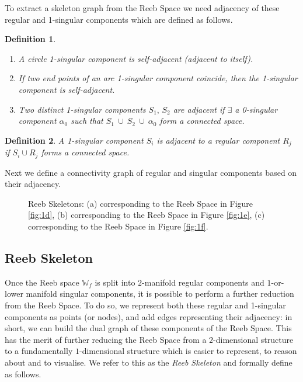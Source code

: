 \documentclass[twocolumn]{article}
\newcommand{\RS}{\mathbb{W}_f}
\newcommand{\figref}[1]{Figure \ref{fig:#1}}
\newtheorem{dfn}{Definition}[section]
\begin{document}
\noindent
To extract a skeleton graph from the Reeb Space we need adjacency of
these regular and 1-singular components which are defined as follows.

\begin{dfn}
\begin{enumerate}
\item A circle 1-singular component is self-adjacent (adjacent to itself).
\item If two end points of an arc 1-singular component coincide, then the
1-singular component is self-adjacent.
\item Two distinct 1-singular components $S_1,\,S_2$ are
adjacent if $\exists$ a 0-singular component $\alpha_0$
such that $S_1~\cup~ S_2~\cup~\alpha_0$ form a connected space.
\end{enumerate}
\end{dfn}

\begin{dfn}
A 1-singular component $S_i$ is adjacent to a
regular component $R_j$ if $S_i\cup R_j$ forms a connected space.
\end{dfn}

Next we define a connectivity graph of regular and singular components
based on their adjacency.

\begin{figure}[t!]
\begin{center}
\end{center}
\vspace*{-2ex}
\caption{Reeb Skeletons: (a) corresponding to the Reeb Space in \figref{1d}, (b)
  corresponding to the Reeb Space in \figref{1e}, (c) corresponding to the
  Reeb Space in \figref{1f}.}
\label{fig:reeb-skeleton}
\end{figure}
\subsection{Reeb Skeleton}
\label{sec:ReebSkeleton}
Once the Reeb space $\RS$ is split into $2$-manifold regular components
and $1$-or-lower manifold singular components, it is possible to
perform a further reduction from the Reeb Space. To do so, we
represent both these regular and 1-singular components as points (or nodes), and add edges representing their
adjacency: in short, we can build the dual graph of these components of the Reeb Space.  This has
the merit of further reducing the Reeb Space from a $2$-dimensional structure to a fundamentally 
$1$-dimensional structure which is easier to represent, to reason about and to visualise.  We refer to this
as the \emph{Reeb Skeleton} and formally define as follows. 
\end{document}
